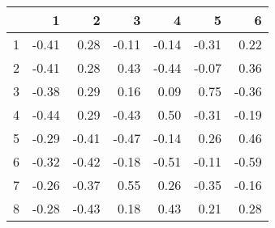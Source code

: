 \begin{table}[ht]
\centering
\begin{tabular}{rrrrrrr}
  \hline
 & 1 & 2 & 3 & 4 & 5 & 6 \\ 
  \hline
1 & -0.41 & 0.28 & -0.11 & -0.14 & -0.31 & 0.22 \\ 
  2 & -0.41 & 0.28 & 0.43 & -0.44 & -0.07 & 0.36 \\ 
  3 & -0.38 & 0.29 & 0.16 & 0.09 & 0.75 & -0.36 \\ 
  4 & -0.44 & 0.29 & -0.43 & 0.50 & -0.31 & -0.19 \\ 
  5 & -0.29 & -0.41 & -0.47 & -0.14 & 0.26 & 0.46 \\ 
  6 & -0.32 & -0.42 & -0.18 & -0.51 & -0.11 & -0.59 \\ 
  7 & -0.26 & -0.37 & 0.55 & 0.26 & -0.35 & -0.16 \\ 
  8 & -0.28 & -0.43 & 0.18 & 0.43 & 0.21 & 0.28 \\ 
   \hline
\end{tabular}
\end{table}
